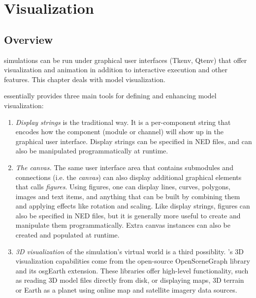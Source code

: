 \chapter{Visualization}
\label{cha:graphics}

\section{Overview}

{\opp} simulations can be run under graphical user interfaces (Tkenv,
Qtenv) that offer visualization and animation in addition to interactive
execution and other features. This chapter deals with model visualization.

{\opp} essentially provides three main tools for defining and enhancing
model visualization:

\begin{enumerate}

    \item \textit{Display strings} is the traditional way. It is a
    per-component string that encodes how the component (module or channel)
    will show up in the graphical user interface. Display strings can be
    specified in NED files, and can also be manipulated programmatically at
    runtime.

    \item \textit{The canvas.} The same user interface area that contains
    submodules and connections (i.e. the \textit{canvas}) can also display
    additional graphical elements that {\opp} calls \textit{figures}. Using
    figures, one can display lines, curves, polygons, images and text items,
    and anything that can be built by combining them and applying effects like
    rotation and scaling. Like display strings, figures can also be specified
    in NED files, but it is generally more useful to create and manipulate them
    programmatically. Extra canvas instances can also be created and populated
    at runtime.

    \item \textit{3D visualization} of the simulation's virtual world is a
    third possiblity. {\opp}'s 3D visualization capabilities come from the
    open-source OpenSceneGraph library and its osgEarth extension. These
    libraries offer high-level functionality, such as reading 3D model files
    directly from disk, or displaying maps, 3D terrain or Earth as a planet
    using online map and satellite imagery data sources.

\end{enumerate}

